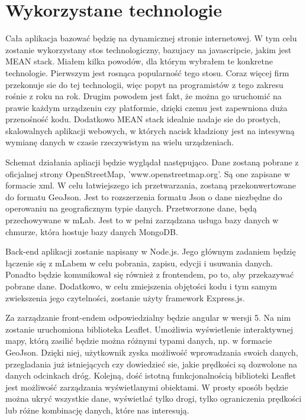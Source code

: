 


\section{Wykorzystane technologie}
\label{sec:wykorzystaneTechnologie}
	Cała aplikacja bazować będzię na dynamicznej stronie internetowej. W tym celu zostanie wykorzystany stos technologiczny, bazujacy na javascripcie, jakim jest MEAN stack. Miałem kilka powodów, dla którym wybrałem te konkretne technologie. Pierwszym jest rosnąca popularność tego stosu. Coraz więcej firm przekonuje sie do tej technologii, więc popyt na programistów z tego zakresu rośnie z roku na rok. Drugim powodem jest fakt, że można go uruchomić na prawie każdym urządzeniu czy platformie, dzięki czemu jest zapewniona duża przenośność kodu. Dodatkowo MEAN stack idealnie nadaje sie do prostych, skalowalnych aplikacji webowych, w których nacisk kładziony jest na intesywną wymianę danych w czasie rzeczywistym na wielu urządzeniach. 
	
	Schemat działania apliacji będzie wyglądał następująco. Dane zostaną pobrane z oficjalnej strony OpenStreetMap, 'www.openstreetmap.org'. Są one zapisane w formacie xml. W celu łatwiejszego ich przetwarzania, zostaną przekonwertowane do formatu GeoJson. Jest to rozszerzenia formatu Json o dane niezbędne do operowaniu na geograficznym typie danych. Przetworzone dane, będą przechowywane w mLab. Jest to w pełni zarządzana usługa bazy danych w chmurze, która hostuje bazy danych MongoDB. 

	Back-end aplikacji zostanie napisany w Node.js. Jego głównym zadaniem będzię łączenie się z mLabem w celu pobrania, zapisu, edycji i usuwania danych. Ponadto będzie komunikował się również z frontendem, po to, aby przekazywać pobrane dane.  Dodatkowo, w celu zmiejszenia objętości kodu i tym samym zwiekszenia jego czytelności, zostanie użyty framework Express.js. 

	Za zarządzanie front-endem odpowiedzialny będzie angular w wersji 5. Na nim zostanie uruchomiona biblioteka Leaflet. Umożliwia wyświetlenie interaktywnej mapy, którą zasilić będzie można różnymi typami danych, np. w formacie GeoJson. Dzięki niej, użytkownik zyska możliwość wprowadzania swoich danych, przegladania już istniejących czy dowiedzieć sie, jakie prędkości są dozwolone na danych odcinkach dróg. Kolejną, dość istotną funkcjonalnością biblioteki Leaflet jest możliwość zarządzania wyświetlanymi obiektami. W prosty sposób będzie można ukryć wszystkie dane, wyświetlać tylko drogi, tylko ograniczenia prędkości lub różne kombinację danych, które nas interesują. 
	
